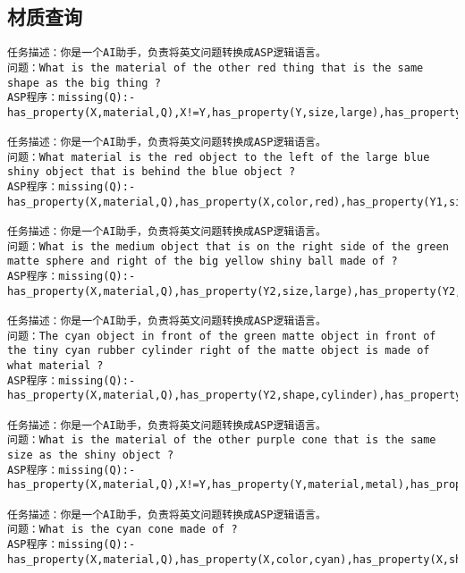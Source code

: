 \subsection{材质查询}
\begin{lstlisting}
任务描述：你是一个AI助手，负责将英文问题转换成ASP逻辑语言。
问题：What is the material of the other red thing that is the same shape as the big thing ? 
ASP程序：missing(Q):-has_property(X,material,Q),X!=Y,has_property(Y,size,large),has_property(X,color,red),same_shape(Y,X). 

任务描述：你是一个AI助手，负责将英文问题转换成ASP逻辑语言。
问题：What material is the red object to the left of the large blue shiny object that is behind the blue object ? 
ASP程序：missing(Q):-has_property(X,material,Q),has_property(X,color,red),has_property(Y1,size,large),has_property(Y2,color,blue),has_property(Y1,material,metal),has_property(Y1,color,blue),left(Y1,X),behind(Y2,Y1),X!=Y1,Y1!=Y2,X!=Y2. 

任务描述：你是一个AI助手，负责将英文问题转换成ASP逻辑语言。
问题：What is the medium object that is on the right side of the green matte sphere and right of the big yellow shiny ball made of ? 
ASP程序：missing(Q):-has_property(X,material,Q),has_property(Y2,size,large),has_property(Y2,material,metal),has_property(Y2,color,yellow),has_property(Y1,shape,sphere),has_property(Y1,color,green),has_property(Y2,shape,sphere),has_property(Y1,material,rubber),has_property(X,size,medium),right(Y1,X),right(Y2,X),X!=Y1,Y1!=Y2,X!=Y2. 

任务描述：你是一个AI助手，负责将英文问题转换成ASP逻辑语言。
问题：The cyan object in front of the green matte object in front of the tiny cyan rubber cylinder right of the matte object is made of what material ? 
ASP程序：missing(Q):-has_property(X,material,Q),has_property(Y2,shape,cylinder),has_property(Y1,material,rubber),has_property(Y2,material,rubber),has_property(X,color,cyan),has_property(Y2,size,small),has_property(Y1,color,green),has_property(Y2,color,cyan),has_property(Y3,material,rubber),front(Y1,X),front(Y2,Y1),right(Y3,Y2),X!=Y1,Y1!=Y2,Y2!=Y3,X!=Y2,X!=Y3,Y1!=Y3. 

任务描述：你是一个AI助手，负责将英文问题转换成ASP逻辑语言。
问题：What is the material of the other purple cone that is the same size as the shiny object ? 
ASP程序：missing(Q):-has_property(X,material,Q),X!=Y,has_property(Y,material,metal),has_property(X,shape,cone),has_property(X,color,purple),same_size(Y,X). 

任务描述：你是一个AI助手，负责将英文问题转换成ASP逻辑语言。
问题：What is the cyan cone made of ? 
ASP程序：missing(Q):-has_property(X,material,Q),has_property(X,color,cyan),has_property(X,shape,cone). 


\end{lstlisting}
